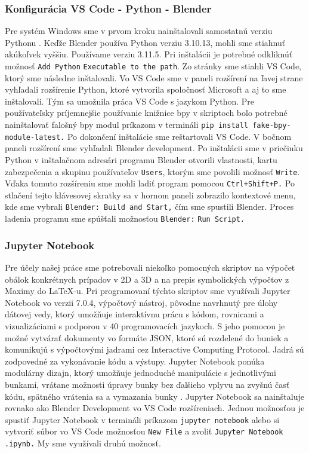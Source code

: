 \subsubsection{Konfigurácia VS Code - Python - Blender}
Pre systém Windows sme v prvom kroku nainštalovali samostatnú verziu Pythonu \cite{PythonDownload}. Keďže Blender používa Python verziu 3.10.13, mohli sme stiahnuť akúkoľvek vyššiu. Používame verziu 3.11.5. Pri inštalácii je potrebné odkliknúť možnosť \verb|Add Python| \verb|Executable to the path|. Zo stránky \cite{VSCode} sme stiahli VS Code, ktorý sme následne inštalovali. Vo VS Code sme v paneli rozšírení na ľavej strane vyhľadali rozšírenie Python, ktoré vytvorila spoločnosť Microsoft a aj to sme inštalovali. Tým sa umožnila práca VS Code s jazykom Python. Pre používateľsky príjemnejšie používanie knižnice bpy v skriptoch bolo potrebné nainštalovať falošný bpy modul \cite{Fake-bpy-module} príkazom v termináli \verb|pip install fake-bpy-| \verb|module-latest.|
Po dokončení inštalácie sme reštartovali VS Code. V bočnom paneli rozšírení sme vyhľadali Blender development. Po inštalácii sme v priečinku Python v inštalačnom adresári programu Blender otvorili vlastnosti, kartu zabezpečenia a skupinu používateľov \verb|Users|, ktorým sme povolili možnosť \verb|Write|. Vďaka tomuto rozšíreniu sme mohli ladiť program pomocou \verb|Ctrl+Shift+P.| Po stlačení tejto klávesovej skratky sa v hornom paneli zobrazilo kontextové menu, kde sme vybrali \verb|Blender: Build and Start,| čím sme spustili Blender. Proces ladenia programu sme spúšťali možnosťou \verb|Blender:| \verb|Run Script.|
\subsubsection{Jupyter Notebook}
Pre účely našej práce sme potrebovali niekoľko pomocných skriptov na výpočet obálok konkrétnych prípadov v 2D a 3D a na prepis symbolických výpočtov z Maximy do \LaTeX-u. Pri programovaní týchto skriptov sme využívali Jupyter Notebook vo verzii 7.0.4, výpočtový nástroj, pôvodne navrhnutý pre úlohy dátovej vedy, ktorý umožňuje interaktívnu prácu s kódom, rovnicami a vizualizáciami s podporou v 40 programovacích jazykoch. S jeho pomocou je možné vytvárať dokumenty vo formáte JSON, ktoré sú rozdelené do buniek a komunikujú s výpočtovými jadrami cez Interactive Computing Protocol. Jadrá sú zodpovedné za vykonávanie kódu a výstupy. Jupyter Notebook ponúka modulárny dizajn, ktorý umožňuje jednoduché manipulácie s jednotlivými bunkami, vrátane možnosti úpravy bunky bez ďalšieho vplyvu na zvyšnú časť kódu, spätného vrátenia sa a vymazania bunky \cite{Jupyter}. Jupyter Notebook sa nainštaluje rovnako ako Blender Development vo VS Code rozšíreniach. 
Jednou možnosťou je spustiť Jupyter Notebook v termináli príkazom \verb|jupyter notebook| alebo si vytvoriť súbor vo VS Code možnosťou \verb|New File| a zvoliť \verb|Jupyter Notebook .ipynb.| My sme využívali druhú možnosť.

